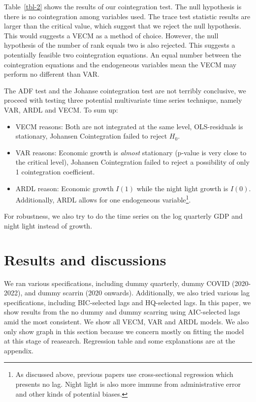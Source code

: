 \documentclass[
]{interact}
\begin{document}
Table~\ref{tbl-2} shows the results of our cointegration test. The null
hypothesis is there is no cointegration among variables used. The trace
test statistic results are larger than the critical value, which suggest
that we reject the null hypothesis. This would suggests a VECM as a
method of choice. However, the null hypothesis of the number of rank
equals two is also rejected. This suggests a potentially feasible two
cointegration equations. An equal number between the cointegration
equations and the endogeneous variables mean the VECM may perform no
different than VAR.

The ADF test and the Johanse cointegration test are not terribly
conclusive, we proceed with testing three potential multivariate time
series technique, namely VAR, ARDL and VECM. To sum up:

\begin{itemize}
\item
  VECM reasons: Both are not integrated at the same level, OLS-residuals
  is stationary, Johansen Cointegration failed to reject \(H_0\).
\item
  VAR reasons: Economic growth is \emph{almost} stationary (p-value is
  very close to the critical level), Johansen Cointegration failed to
  reject a possibility of only 1 cointegration coefficient.
\item
  ARDL reason: Economic growth \(I(1)\) while the night light growth is
  \(I(0)\). Additionally, ARDL allows for one endogeneous
  variable\footnote{As discussed above, previous papers use
    cross-sectional regression which presents no lag. Night light is
    also more immune from administrative error and other kinds of
    potential biases.}.
\end{itemize}

For robustness, we also try to do the time series on the log quarterly
GDP and night light instead of growth.

\section{Results and discussions}\label{results-and-discussions}

We ran various specifications, including dummy quarterly, dummy COVID
(2020-2022), and dummy scarrin (2020 onwards). Additionally, we also
tried various lag specifications, including BIC-selected lags and
HQ-selected lags. In this paper, we show results from the no dummy and
dummy scarring using AIC-selected lags amid the most consistent. We show
all VECM, VAR and ARDL models. We also only show graph in this section
because we concern mostly on fitting the model at this stage of
reasearch. Regression table and some explanations are at the appendix.
\end{document}
